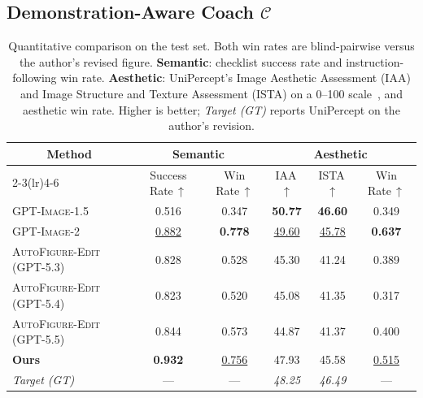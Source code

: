 \documentclass[11pt]{article}
\begin{document}
\subsection{Demonstration-Aware Coach $\mathcal{C}$}
\label{sec:proposer}

\begin{table}[!t]
\centering\small
\begin{tabular*}{\linewidth}{@{\extracolsep{\fill}}lccccc@{}}
\toprule
\multicolumn{1}{c}{\multirow{2}{*}{\textbf{Method}}}
& \multicolumn{2}{c}{\textbf{Semantic}}
& \multicolumn{3}{c}{\textbf{Aesthetic}} \\
\cmidrule(lr){2-3}\cmidrule(lr){4-6}
  & Success Rate\,$\uparrow$
  & Win Rate\,$\uparrow$
  & IAA\,$\uparrow$
  & ISTA\,$\uparrow$
  & Win Rate\,$\uparrow$ \\
\midrule
\textsc{GPT-Image-1.5}~\citep{openai2025gptimage}      & 0.516         & 0.347         & \textbf{50.77}   & \textbf{46.60}   & 0.349             \\
\textsc{GPT-Image-2}~\citep{openai2025gptimage}        & \underline{0.882}& \textbf{0.778}& \underline{49.60}& \underline{45.78}& \textbf{0.637}    \\
\midrule
\textsc{AutoFigure-Edit} (\textsc{GPT-5.3})~\citep{lin2026autofigure} & 0.828         & 0.528         & 45.30         & 41.24         & 0.389             \\
\textsc{AutoFigure-Edit} (\textsc{GPT-5.4})~\citep{lin2026autofigure} & 0.823         & 0.520         & 45.08         & 41.35         & 0.317             \\
\textsc{AutoFigure-Edit} (\textsc{GPT-5.5})~\citep{lin2026autofigure} & 0.844         & 0.573         & 44.87         & 41.37         & 0.400             \\
\midrule
\textbf{Ours}                      & \textbf{0.932}& \underline{0.756}& 47.93            & 45.58            & \underline{0.515} \\
\midrule
\textit{Target (GT)}              & ---           & ---           & \textit{48.25}& \textit{46.49}& ---            \\
\bottomrule
\end{tabular*}
\caption{Quantitative comparison on the test set.  Both win
rates are blind-pairwise versus the author's revised figure.
\textbf{Semantic}: checklist success rate and
instruction-following win rate.  \textbf{Aesthetic}:
UniPercept's Image Aesthetic Assessment (IAA) and Image
Structure and Texture Assessment (ISTA) on a 0--100
scale~\citep{liao2026aibench}, and aesthetic win rate.
Higher is better; \emph{Target (GT)} reports UniPercept on
the author's revision.}
\label{tab:main-results}
\end{table}
\end{document}
